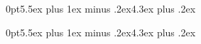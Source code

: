 \usepackage[dvipsnames]{xcolor}
\usepackage{amsfonts}
\usepackage{mathrsfs}
\usepackage{subfiles}
\usepackage{mathtools}
\usepackage{setspace}
\usepackage[utf8]{inputenc}
\usepackage{hyperref}
\usepackage{titlesec}
\usepackage{tocloft}
\usepackage{longtable}


\titlespacing*{\section}
{0pt}{5.5ex plus 1ex minus .2ex}{4.3ex plus .2ex}


\titlespacing*{\subsection}
{0pt}{5.5ex plus 1ex minus .2ex}{4.3ex plus .2ex}

\hypersetup{
	colorlinks=true, %
	linktoc=all,     %
	linkcolor=blue,  %
}

\doublespacing
